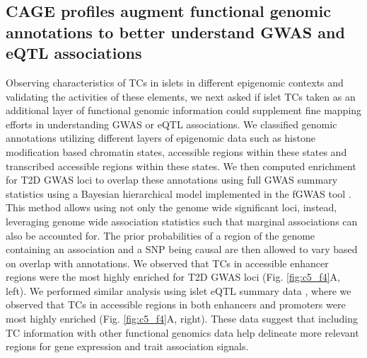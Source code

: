 \subsection{CAGE profiles augment functional genomic annotations to better understand GWAS and eQTL associations}
Observing characteristics of TCs in islets in different epigenomic contexts and validating the activities of these elements, we next asked if islet TCs taken as an additional layer of functional genomic information could supplement fine mapping efforts in understanding GWAS or eQTL associations. We classified genomic annotations utilizing different layers of epigenomic data such as histone modification based chromatin states, accessible regions within these states and transcribed accessible regions within these states. We then computed enrichment for T2D GWAS loci to overlap these annotations using full GWAS summary statistics \cite{mahajanFinemappingTypeDiabetes2018} using a Bayesian hierarchical model implemented in the fGWAS tool \cite{pickrellJointAnalysisFunctional2014}. This method allows using not only the genome wide significant loci, instead, leveraging genome wide association statistics such that marginal associations can also be accounted for. The prior probabilities of a region of the genome containing an association and a SNP being causal are then allowed to vary based on overlap with annotations. We observed that TCs in accessible enhancer regions were the most highly enriched for T2D GWAS loci (Fig. \ref{fig:c5_f4}A, left). We performed similar analysis using islet eQTL summary data \cite{varshneyGeneticRegulatorySignatures2017}, where we observed that TCs in accessible regions in both enhancers and promoters were most highly enriched (Fig. \ref{fig:c5_f4}A, right). These data suggest that including TC information with other functional genomics data help delineate more relevant regions for gene expression and trait association signals.     



